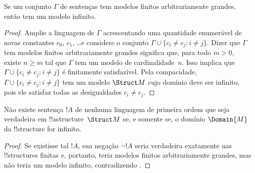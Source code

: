 \documentclass[../../../include/open-logic-section]{subfiles}
\begin{document}

\begin{thm}
 Se um conjunto $\Gamma$ de sentenças tem modelos
finitos arbitrariamente grandes, então tem um modelo infinito.
\end{thm}

\begin{proof}
Amplie a linguagem de $\Gamma$ acrescentando uma quantidade enumerável
de novas constantes $c_0$, $c_1$, \dots e considere o conjunto $\Gamma
\cup \{c_i \neq c_j : i \neq j\}$. Dizer que $\Gamma$ tem modelos
finitos arbitrariamente grandes significa que, para todo $m >0$, existe
$n\ge m$ tal que $\Gamma$ tem um modelo de cardinalidade~$n$. Isso
implica que $\Gamma \cup \{c_i \neq c_j : i \neq j\}$ é finitamente
satisfazível. Pela compacidade, $\Gamma \cup \{c_i \neq c_j : i \neq
j\}$ tem um modelo $\Struct M$ cujo domínio deve ser infinito, pois ele
satisfaz todas as desigualdades $c_i \neq c_j$.
\end{proof}

\begin{prop}
Não existe sentença $!A$ de nenhuma linguagem de primeira ordem que seja
verdadeira em !!a{structure}~$\Struct M$ se, e somente se, o domínio
$\Domain{M}$ da !!{structure} for infinito.
\end{prop}

\begin{proof}
Se existisse tal $!A$, sua negação $\lnot !A$ seria verdadeira exatamente
nas !!{structure}s finitas e, portanto, teria modelos finitos
arbitrariamente grandes, mas não teria um modelo infinito, contradizendo
.
\end{proof}
\end{document}
